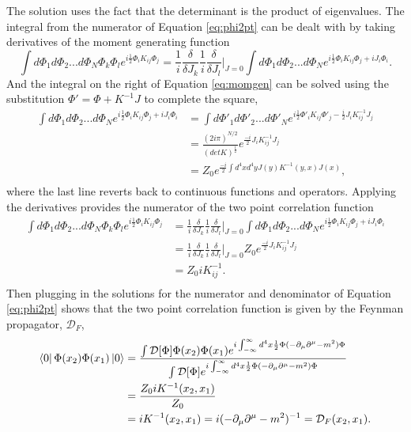 \documentclass[12pt]{article}
\begin{document}
The solution uses the fact that the determinant is the product of eigenvalues. The integral from the numerator of Equation \ref{eq:phi2pt} can be dealt with by taking derivatives of the moment generating function 
\begin{equation}
\label{eq:momgen}
\int d\Phi_1 d\Phi_2 ... d\Phi_N \Phi_k\Phi_l e^{i\frac{1}{2}\Phi_{i} K_{ij} \Phi_{j}} 
= \frac{1}{i}\frac{\delta}{\delta J_k}\frac{1}{i}\frac{\delta}{\delta J_l}\Big|_{J=0} 
\int d\Phi_1 d\Phi_2 ... d\Phi_N e^{i\frac{1}{2}\Phi_{i} K_{ij} \Phi_{j} + iJ_i\Phi_i}. 
\end{equation}
And the integral on the right of Equation \ref{eq:momgen} can be solved using the substitution $\Phi' = \Phi + K^{-1}J$ to complete the square, 
\begin{equation}
\begin{split}
\int d\Phi_1 d\Phi_2 ... d\Phi_N e^{i\frac{1}{2}\Phi_{i} K_{ij} \Phi_{j} + iJ_i\Phi_i} 
&= \int d\Phi'_1 d\Phi'_2 ... d\Phi'_N e^{i\frac{1}{2}\Phi'_{i} K_{ij} \Phi'_{j} - \frac{i}{2}J_i K^{-1}_{ij} J_j}\\ 
&= \frac{\left( 2i\pi \right)^{N/2}}{ \left( detK \right)^\frac{1}{2}}e^{\frac{-i}{2}J_i K^{-1}_{ij} J_j}\\
&= Z_0e^{\frac{-i}{2}\int d^4x d^4y J(y) K^{-1}(y,x) J(x)},\\
\end{split}
\end{equation}
where the last line reverts back to continuous functions and operators. Applying the derivatives provides the numerator of the two point correlation function 
\begin{equation}
\begin{split}
\int d\Phi_1 d\Phi_2 ... d\Phi_N \Phi_k\Phi_l e^{i\frac{1}{2}\Phi_{i} K_{ij} \Phi_{j}} 
& = \frac{1}{i}\frac{\delta}{\delta J_k}\frac{1}{i}\frac{\delta}{\delta J_l}\Big|_{J=0} \int d\Phi_1 d\Phi_2 ... d\Phi_N e^{i\frac{1}{2}\Phi_{i} K_{ij} \Phi_{j} + iJ_i\Phi_i} \\
& = \frac{1}{i}\frac{\delta}{\delta J_k}\frac{1}{i}\frac{\delta}{\delta J_l}\Big|_{J=0} Z_0e^{\frac{-i}{2}J_i K^{-1}_{ij} J_j} \\ 
& = Z_0 iK^{-1}_{ij}. \\
\end{split}
\end{equation}
Then plugging in the solutions for the numerator and denominator of Equation \ref{eq:phi2pt} shows that the two point correlation function is given by the Feynman propagator, $\mathcal{D}_F$, 
\begin{equation}
\begin{split}
\bra{0}\Phi(x_2)\Phi(x_1)\ket{0} &= 
\frac{\int \mathcal{D}[\Phi]\Phi(x_2)\Phi(x_1)e^{i\int_{-\infty}^{\infty} d^4x \frac{1}{2}\Phi (-\partial_\mu\partial^\mu - m^2)\Phi}}
{\int \mathcal{D}[\Phi]e^{i\int_{-\infty}^{\infty} d^4x \frac{1}{2}\Phi (-\partial_\mu\partial^\mu - m^2)\Phi}} \\
&= \frac{Z_0 iK^{-1}(x_2,x_1)}{Z_0} \\
&= iK^{-1}(x_2,x_1) = i(-\partial_\mu\partial^\mu - m^2)^{-1} = \mathcal{D}_F(x_2,x_1).\\ 
\end{split}
\end{equation}
\end{document}
